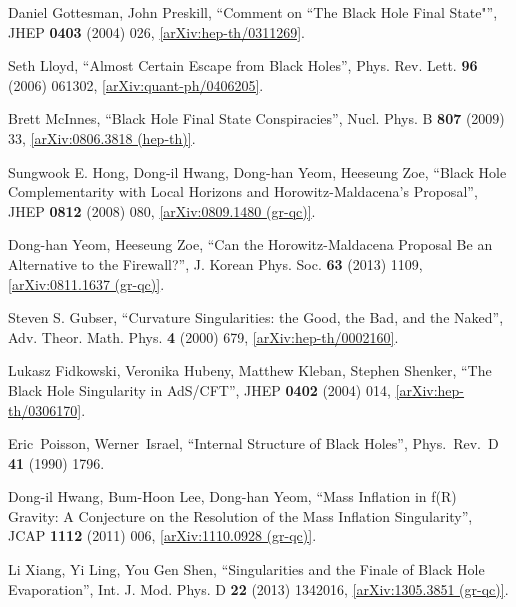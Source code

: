 \documentclass[12pt]{article}
\newcommand{\2}{$^2$}
\newcommand{\3}{$^3$}
\newcommand{\4}{$_4$}
\newcommand{\5}{$_5$}
\begin{document}
\begin{thebibliography}{400}
Daniel Gottesman, John Preskill, ``Comment on ``The Black Hole Final State"'', JHEP \textbf{0403} (2004) 026, \href{http://arxiv.org/abs/hep-th/0311269}{[arXiv:hep-th/0311269]}.

Seth Lloyd, ``Almost Certain Escape from Black Holes'', Phys. Rev. Lett. \textbf{96} (2006) 061302, \href{http://arxiv.org/abs/quant-ph/0406205}{[arXiv:quant-ph/0406205]}.

Brett McInnes, ``Black Hole Final State Conspiracies'', Nucl. Phys. B \textbf{807} (2009) 33, \href{http://arxiv.org/abs/0806.3818}{[arXiv:0806.3818 (hep-th)]}.

Sungwook E. Hong, Dong-il Hwang, Dong-han Yeom, Heeseung Zoe, ``Black Hole Complementarity with Local Horizons and Horowitz-Maldacena's Proposal'', JHEP \textbf{0812} (2008) 080, \href{http://arxiv.org/abs/0809.1480}{[arXiv:0809.1480 (gr-qc)]}. 

Dong-han Yeom, Heeseung Zoe,
``Can the Horowitz-Maldacena Proposal Be an Alternative to the Firewall?'', J. Korean Phys. Soc. \textbf{63} (2013) 1109, \href{http://arxiv.org/abs/0811.1637}{[arXiv:0811.1637 (gr-qc)]}.

Steven S. Gubser, ``Curvature Singularities: the Good, the Bad, and the Naked'', Adv. Theor. Math. Phys. \textbf{4} (2000) 679, \href{http://arxiv.org/abs/hep-th/0002160}{[arXiv:hep-th/0002160]}.

Lukasz Fidkowski, Veronika Hubeny, Matthew Kleban, Stephen Shenker, ``The Black Hole Singularity in AdS/CFT'',
JHEP \textbf{0402} (2004) 014, \href{http://arxiv.org/abs/hep-th/0306170}{[arXiv:hep-th/0306170]}.


  Eric~Poisson, Werner~Israel,
  ``Internal Structure of Black Holes'', Phys.\ Rev.\ D {\bf 41} (1990) 1796.
	


Dong-il Hwang, Bum-Hoon Lee, Dong-han Yeom,
  ``Mass Inflation in f(R) Gravity: A Conjecture on the Resolution of the Mass Inflation Singularity'',
  JCAP {\bf 1112} (2011) 006,
	\href{http://arxiv.org/abs/1110.0928}{[arXiv:1110.0928 (gr-qc)]}.
	
Li Xiang, Yi Ling, You Gen Shen, ``Singularities and the Finale of Black Hole Evaporation'', Int. J. Mod. Phys. D \textbf{22} (2013) 1342016, \href{http://arxiv.org/abs/1305.3851}{[arXiv:1305.3851 (gr-qc)]}.
	

\end{thebibliography}
\end{document}
